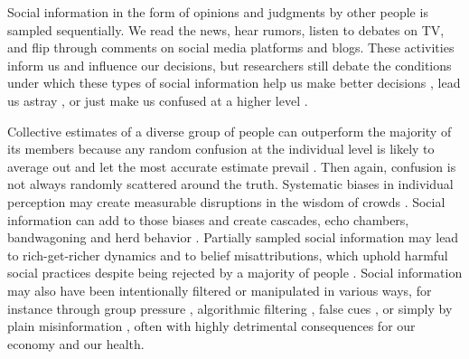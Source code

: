 \documentclass[9pt,a4paper,twocolumn,lineno]{article}
\begin{document}
%

Social information in the form of opinions and judgments by other people is sampled sequentially. We read the news, hear rumors, listen to debates on TV, and flip through comments on social media platforms and blogs. These activities inform us and influence our decisions, but researchers still debate the conditions under which these types of social information help us make better decisions \cite{woolley2010evidence, gurccay2015power, becker2017network, jayles2017social}, lead us astray \cite{caplan2011myth, lorenz2011social, minson2012cost, king2011true, le2018endogenous}, or just make us confused at a higher level \cite{salganik2006experimental, salganik2009web}.

Collective estimates of a diverse group of people can outperform the majority of its members because any random confusion at the individual level is likely to average out and let the most accurate estimate prevail \cite{galton1907vox, muth1961rational, surowiecki2005wisdom, hong2008some}. Then again, confusion is not always randomly scattered around the truth. Systematic biases in individual perception may create measurable disruptions in the wisdom of crowds \cite{izard2008calibrating, nash2014curious, kao2018counteracting}. Social information can add to those biases and create cascades, echo chambers, bandwagoning and herd behavior \cite{anderson1997information, bikhchandani1992theory, bakshy2015exposure, banerjee1992simple}. Partially sampled social information may lead to rich-get-richer dynamics \cite{barabasi1999emergence} and to belief misattributions, which uphold harmful social practices despite being rejected by a majority of people \cite{katz1931students, darley1968bystander, ross1977false, noelle1974spiral, lee2019homophily}. Social information may also have been intentionally filtered or manipulated in various ways, for instance through group pressure \cite{asch1951effects}, algorithmic filtering \cite{pariser2011filter}, false cues \cite{salganik2006experimental, muchnik2013social, hanson1996hits}, or simply by plain misinformation \cite{hendricks2018reality}, often with highly detrimental consequences for our economy and our health.
\end{document}
